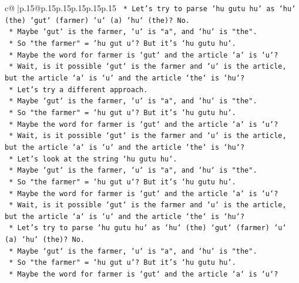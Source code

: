 \documentclass{article}
\begin{document}
{\begin{supertabular}{c@{$\;$}|p{.15\linewidth}@{}p{.15\linewidth}p{.15\linewidth}p{.15\linewidth}p{.15\linewidth}p{.15\linewidth}}
{{{\texttt{                *   Let's try to parse `hu gutu hu` as `hu` (the) `gut` (farmer) `u` (a) `hu` (the)? No.} \\
\texttt{                *   Maybe `gut` is the farmer, `u` is "a", and `hu` is "the".} \\
\texttt{                *   So "the farmer" = `hu gut u`? But it's `hu gutu hu`.} \\
\texttt{                *   Maybe the word for farmer is `gut` and the article `a` is `u`?} \\
\texttt{                *   Wait, is it possible `gut` is the farmer and `u` is the article, but the article `a` is `u` and the article `the` is `hu`?} \\
\texttt{                *   Let's try a different approach.} \\
\texttt{                *   Maybe `gut` is the farmer, `u` is "a", and `hu` is "the".} \\
\texttt{                *   So "the farmer" = `hu gut u`? But it's `hu gutu hu`.} \\
\texttt{                *   Maybe the word for farmer is `gut` and the article `a` is `u`?} \\
\texttt{                *   Wait, is it possible `gut` is the farmer and `u` is the article, but the article `a` is `u` and the article `the` is `hu`?} \\
\texttt{                *   Let's look at the string `hu gutu hu`.} \\
\texttt{                *   Maybe `gut` is the farmer, `u` is "a", and `hu` is "the".} \\
\texttt{                *   So "the farmer" = `hu gut u`? But it's `hu gutu hu`.} \\
\texttt{                *   Maybe the word for farmer is `gut` and the article `a` is `u`?} \\
\texttt{                *   Wait, is it possible `gut` is the farmer and `u` is the article, but the article `a` is `u` and the article `the` is `hu`?} \\
\texttt{                *   Let's try to parse `hu gutu hu` as `hu` (the) `gut` (farmer) `u` (a) `hu` (the)? No.} \\
\texttt{                *   Maybe `gut` is the farmer, `u` is "a", and `hu` is "the".} \\
\texttt{                *   So "the farmer" = `hu gut u`? But it's `hu gutu hu`.} \\
\texttt{                *   Maybe the word for farmer is `gut` and the article `a` is `u`?} \\
}}}
\end{supertabular}}
\end{document}
